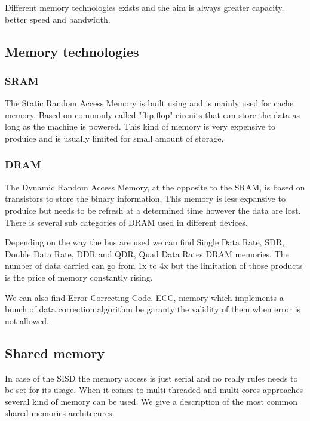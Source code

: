 Different memory technologies exists and the aim is always greater capacity, better speed and bandwidth.

\subsection{Memory technologies}


\subsubsection{SRAM}
The Static Random Access Memory is built using and is mainly used for cache memory. 
Based on commonly called "flip-flop" circuits that can store the data as long as the machine is powered. 
This kind of memory is very expensive to produice and is usually limited for small amount of storage. 

\subsubsection{DRAM}
The Dynamic Random Access Memory, at the opposite to the SRAM, is based on transistors to store the binary information.
This memory is less expansive to produice but needs to be refresh at a determined time however the data are lost. 
There is several sub categories of DRAM used in different devices. 

Depending on the way the bus are used we can find Single Data Rate, SDR, Double Data Rate, DDR and QDR, Quad Data Rates DRAM memories. 
The number of data carried can go from 1x to 4x but the limitation of those products is the price of memory constantly rising. 

We can also find Error-Correcting Code, ECC, memory which implements a bunch of data correction algorithm be garanty the validity of them when error is not allowed. 


\subsection{Shared memory}
In case of the SISD the memory access is just serial and no really rules needs to be set for its usage. 
When it comes to multi-threaded and multi-cores approaches several kind of memory can be used. 
We give a description of the most common shared memories architecures. 

